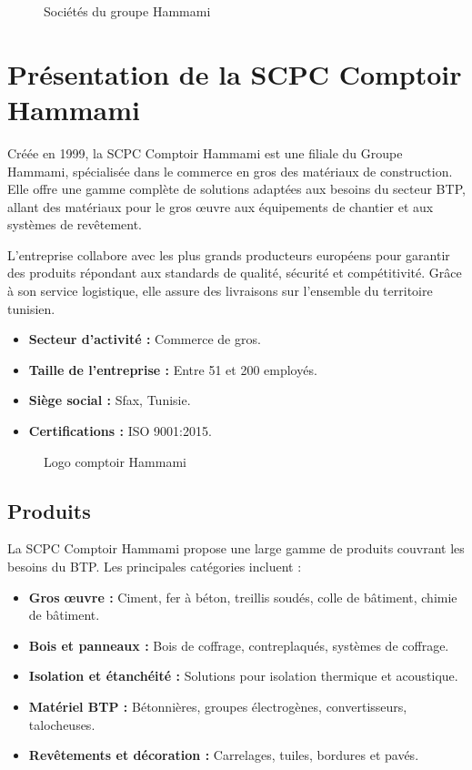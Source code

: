\begin{figure}[H]
    \centering
    \caption{Sociétés du groupe Hammami}
    \label{fig:societes_groupe}
\end{figure}

\section{Présentation de la SCPC Comptoir Hammami}
Créée en 1999, la SCPC Comptoir Hammami est une filiale du Groupe Hammami, spécialisée dans le commerce en gros des matériaux de construction. Elle offre une gamme complète de solutions adaptées aux besoins du secteur BTP, allant des matériaux pour le gros œuvre aux équipements de chantier et aux systèmes de revêtement.

L’entreprise collabore avec les plus grands producteurs européens pour garantir des produits répondant aux standards de qualité, sécurité et compétitivité. Grâce à son service logistique, elle assure des livraisons sur l’ensemble du territoire tunisien.

\begin{itemize}
    \item \textbf{Secteur d’activité :} Commerce de gros.
    \item \textbf{Taille de l’entreprise :} Entre 51 et 200 employés.
    \item \textbf{Siège social :} Sfax, Tunisie.
    \item \textbf{Certifications :} ISO 9001:2015.
\end{itemize}

\begin{figure}[H]
    \centering
    \caption{Logo comptoir Hammami}
    \label{fig:logo_scpc}
\end{figure}

\subsection{Produits}
La SCPC Comptoir Hammami propose une large gamme de produits couvrant les besoins du BTP. Les principales catégories incluent :
\begin{itemize}
    \item \textbf{Gros œuvre :} Ciment, fer à béton, treillis soudés, colle de bâtiment, chimie de bâtiment.
    \item \textbf{Bois et panneaux :} Bois de coffrage, contreplaqués, systèmes de coffrage.
    \item \textbf{Isolation et étanchéité :} Solutions pour isolation thermique et acoustique.
    \item \textbf{Matériel BTP :} Bétonnières, groupes électrogènes, convertisseurs, talocheuses.
    \item \textbf{Revêtements et décoration :} Carrelages, tuiles, bordures et pavés.
\end{itemize}

